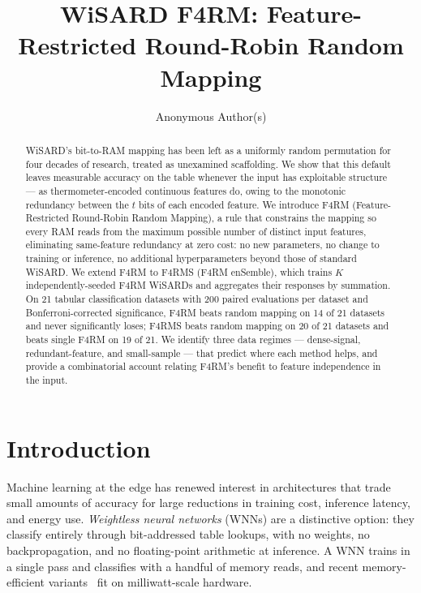 \documentclass[runningheads]{llncs}
\begin{document}
\title{WiSARD F4RM: Feature-Restricted Round-Robin Random Mapping}


\author{Anonymous Author(s)}



\maketitle

\begin{abstract}
WiSARD's bit-to-RAM mapping has been left as a uniformly random permutation for four decades of research, treated as unexamined scaffolding. We show that this default leaves measurable accuracy on the table whenever the input has exploitable structure --- as thermometer-encoded continuous features do, owing to the monotonic redundancy between the $t$ bits of each encoded feature. We introduce F4RM (Feature-Restricted Round-Robin Random Mapping), a rule that constrains the mapping so every RAM reads from the maximum possible number of distinct input features, eliminating same-feature redundancy at zero cost: no new parameters, no change to training or inference, no additional hyperparameters beyond those of standard WiSARD. We extend F4RM to F4RMS (F4RM enSemble), which trains $K$ independently-seeded F4RM WiSARDs and aggregates their responses by summation. On 21 tabular classification datasets with 200 paired evaluations per dataset and Bonferroni-corrected significance, F4RM beats random mapping on 14 of 21 datasets and never significantly loses; F4RMS beats random mapping on 20 of 21 datasets and beats single F4RM on 19 of 21. We identify three data regimes --- dense-signal, redundant-feature, and small-sample --- that predict where each method helps, and provide a combinatorial account relating F4RM's benefit to feature independence in the input.

\end{abstract}


\section{Introduction}
\label{sec:introduction}

Machine learning at the edge has renewed interest in architectures that trade small amounts of accuracy for large reductions in training cost, inference latency, and energy use. \emph{Weightless neural networks} (WNNs) are a distinctive option: they classify entirely through bit-addressed table lookups, with no weights, no backpropagation, and no floating-point arithmetic at inference. A WNN trains in a single pass and classifies with a handful of memory reads, and recent memory-efficient variants~\cite{susskind2022bthowen,susskind2023uleen,bacellar2022logicwisard} fit on milliwatt-scale hardware.
\end{document}
